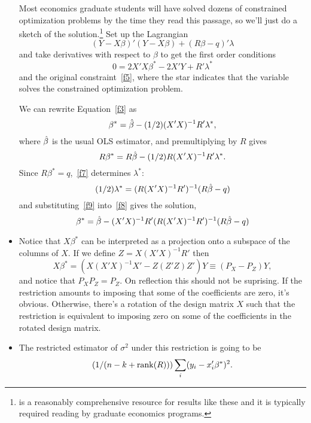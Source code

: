 \begin{itemize}[leftmargin=0pt]
  Most economics graduate students will have solved dozens of
  constrained optimization problems by the time they read this
  passage, so we'll just do a sketch of the
  solution.\footnote{\citet{SB94} is a reasonably comprehensive
    resource for results like these and it is typically required
    reading by graduate economics programs.}  Set up the Lagrangian
  \begin{equation}\label{f6}
    (Y - X\beta)'(Y - X\beta) + (R\beta - q)' \lambda
  \end{equation}
  and take derivatives with respect to $\beta$ to get the first order
  conditions
  \begin{equation}\label{f3}
    0 = 2X'X \beta^* - 2 X'Y + R'\lambda^*
  \end{equation}
  and the original constraint~\eqref{f5}, where the star indicates
  that the variable solves the constrained optimization problem.
  
  We can rewrite Equation~\eqref{f3} as
  \begin{equation}\label{f8}
    \beta^* = \hat{\beta} - (1/2) (X'X)^{-1} R'\lambda^*,
  \end{equation}
  where $\hat{\beta}$ is the usual OLS estimator, and premultiplying by $R$
  gives
  \begin{equation}\label{f7}
    R\beta^* = R \hat{\beta} - (1/2) R (X'X)^{-1} R'\lambda^*.
  \end{equation}
  Since $R\beta^* = q$,~\eqref{f7} determines $\lambda^*$:
  \begin{equation}\label{f9}
    (1/2) \lambda^* = (R (X'X)^{-1} R')^{-1} (R \hat{\beta} - q)
  \end{equation}
  and substituting~\eqref{f9} into~\eqref{f8} gives the solution,
  \begin{equation}\label{f10}
    \beta^* = \hat{\beta} - (X'X)^{-1} R' (R (X'X)^{-1} R')^{-1} (R \hat{\beta} - q)
  \end{equation}

\item Notice that $X\beta^*$ can be interpreted as a projection onto a
  subspace of the columns of $X$.  If we define $Z = X (X'X)^{-1} R'$
  then
  \begin{equation*}
    X \beta^* = (X(X'X)^{-1}X' - Z(Z'Z)Z') Y \equiv (P_X - P_Z) Y,
  \end{equation*}
  and notice that $P_X P_Z = P_Z$.  On reflection this should not be
  suprising.  If the restriction amounts to imposing that some of the
  coefficients are zero, it's obvious.  Otherwise, there's a rotation
  of the design matrix $X$ such that the restriction is equivalent to
  imposing zero on some of the coefficients in the rotated design
  matrix.

\item The restricted estimator of $\sigma^2$ under this restriction is going
  to be
  \begin{equation*}
    (1/(n - k + \operatorname{rank}(R))) \sum_i (y_i - x_i'\beta^*)^2.
  \end{equation*}

\end{itemize}

